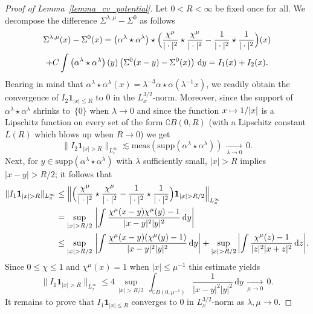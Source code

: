 \documentclass[11pt]{article}
\newcommand\mto{\mathchoice{\longmapsto}{\mapsto}{\mapsto}{\mapsto}}
\theoremstyle{definition}
\newenvironment{ProofOf}[1]{\begin{proof}[Proof of #1]}{\end{proof}}
\newcommand{\ud}{\, {\mathrm{d}}}
\begin{document}
\begin{ProofOf}{Lemma~\ref{lemma_cv_potential}}
Let $0<R<\infty$ be fixed once for all. We decompose the difference $\Sigma^{\lambda,\mu}-\Sigma^{0}$ as follows
\begin{multline*}
\Sigma^{\lambda,\mu}(x)-\Sigma^{0}(x)=\left(\alpha^{\lambda}\star\alpha^{\lambda}\right)\star\Bigl(\frac{\chi^{\mu}}{|\cdot|^{2}}\star\frac{\chi^{\mu}}{|\cdot|^{2}}-\frac{1}{|\cdot|^{2}}\star\frac{1}{|\cdot|^{2}}\Bigr)(x)\\
+C\int\left(\alpha^{\lambda}\star\alpha^{\lambda}\right)(y)\left(\Sigma^{0}(x-y)-\Sigma^{0}(x)\right)\ud y=I_{1}(x)+I_{2}(x).
\end{multline*}
Bearing in mind that $\alpha^{\lambda}\star\alpha^{\lambda}(x)=\lambda^{-3}\alpha\star\alpha(\lambda^{-1}x)$,
we readily obtain
the convergence of $I_{2}\mathbf{1}_{|x|\leq R}$ to 0 in the $L_{x}^{3/2}$-norm. Moreover, since the support of $\alpha^{\lambda}\star\alpha^{\lambda}$ shrinks to~$\{0\}$ when $\lambda\to 0$ and since the function $x\mto 1/|x|$ is a Lipschitz function on every set of the form $\complement B(0,R)$ (with a Lipschitz constant $L(R)$ which blows up when $R\to 0$) we get
\[
\|I_{2}\mathbf{1}_{|x|>R}\|_{L_{x}^{\infty}}\lesssim\mathrm{meas}\left(\mathrm{supp}\left(\alpha^{\lambda}\star\alpha^{\lambda}\right)\right)\,\underset{\lambda\to 0}{\to}\,0.
\]
Next, for $y\in \mathrm{supp}(\alpha^\lambda\star\alpha^\lambda)$ with $\lambda$ sufficiently small, $|x|>R$ implies $|x-y|>R/2$; it follows that
\begin{align*}
\|I_{1}\mathbf{1}_{|x|>R}\|_{L_{x}^{\infty}}
&\leq\Bigl\|\Bigl(\frac{\chi^{\mu}}{|\cdot|^{2}}\star\frac{\chi^{\mu}}{|\cdot|^{2}}-\frac{1}{|\cdot|^{2}}\star\frac{1}{|\cdot|^{2}}\Bigr)\mathbf{1}_{|x|>R/2}\Bigr\|_{L_{x}^{\infty}}\\
&=\underset{|x|>R/2}{\sup}\,\left|\int\frac{\chi^{\mu}(x-y)\chi^{\mu}(y)-1}{|x-y|^{2}|y|^{2}}\ud y\right|\\
&\leq\underset{|x|>R/2}{\sup}\,\left|\int\frac{\chi^{\mu}(x-y)(\chi^{\mu}(y)-1)}{|x-y|^{2}|y|^{2}}\ud y\right|+\underset{|x|>R/2}{\sup}\,\biggl|\int\frac{\chi^{\mu}(z)-1}{|z|^{2}|x+z|^{2}}\ud z\biggr|.
\end{align*}
Since $0\leq\chi\leq 1$ and $\chi^{\mu}(x)=1$ when $|x|\leq \mu^{-1}$ this estimate yields
\[
\|I_{1}\mathbf{1}_{|x|>R}\|_{L_{x}^{\infty}}\leq 4\,\underset{|x|>R/2}{\sup}\,\int_{\complement B(0,\mu^{-1})}\frac{1}{|x-y|^{2}|y|^{2}}\ud y\,\underset{\mu\to 0}{\to}\,0.
\]
It remains to prove that $I_{1}\mathbf{1}_{|x|\leq R}$ converges to $0$ in $L_{x}^{3/2}$-norm as $\lambda,\mu\to 0$.

\end{ProofOf}
\end{document}
